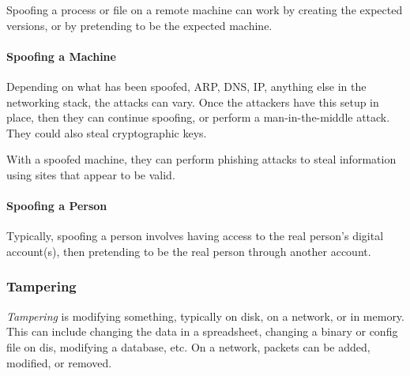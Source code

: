 Spoofing a process or file on a remote machine can work by creating the expected versions, or by pretending to be the expected machine.

\paragraph{Spoofing a Machine}\label{par:Spoofing_Machine}
Depending on what has been spoofed, ARP, DNS, IP, anything else in the networking stack, the attacks can vary.
Once the attackers have this setup in place, then they can continue spoofing, or perform a man-in-the-middle attack.
They could also steal cryptographic keys.

With a spoofed machine, they can perform phishing attacks to steal information using sites that appear to be valid.

\paragraph{Spoofing a Person}\label{par:Spoofing_Person}
Typically, spoofing a person involves having access to the real person's digital account(s), then pretending to be the real person through another account.

\subsubsection{Tampering}\label{subsubsec:Tampering}
\begin{definition}[Tampering]\label{def:Tampering}
  \emph{Tampering} is modifying something, typically on disk, on a network, or in memory.
  This can include changing the data in a spreadsheet, changing a binary or config file on dis, modifying a database, etc.
  On a network, packets can be added, modified, or removed.
\end{definition}


